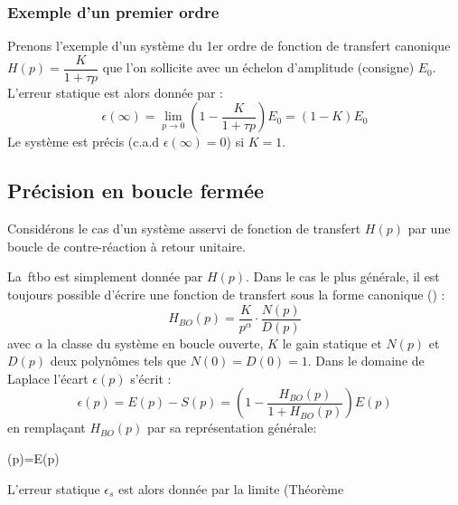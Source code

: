 \subsubsection{Exemple d'un premier ordre}
Prenons l'exemple d'un système du 1er ordre de fonction de transfert canonique 
$H(p)=\dfrac{K}{1+\tau p}$ que l'on sollicite avec un échelon 
d'amplitude (consigne) $E_0$.
L'erreur statique est alors donnée par :
\[
\epsilon(\infty)=\lim\limits_{p\to 0}\left(1-\dfrac{K}{1+\tau p}\right)E_0
                =(1-K)E_0
\]
Le système est précis (c.a.d $\epsilon(\infty)=0$) si $K=1$. 
\subsection{Précision en boucle fermée}
Considérons le cas d'un système asservi de fonction de transfert $H(p)$
par une boucle de contre-réaction à retour unitaire.
\begin{center}
    
\end{center}
La~\gls{ftbo} est simplement donnée par $H(p)$. Dans le cas le plus
générale, il est toujours possible d'écrire une fonction de transfert
sous la forme canonique () :
\[
H_{BO}(p)=\dfrac{K}{p^\alpha}\cdot\dfrac{N(p)}{D(p)}
\]
avec $\alpha$ la classe du système en boucle ouverte, $K$ le gain statique et 
$N(p)$ et $D(p)$ deux polynômes tels que $N(0)=D(0)=1$. 
Dans le domaine de Laplace l'écart $\epsilon(p)$ s'écrit :
\[
\epsilon(p)=E(p)-S(p)=\left(1-\dfrac{H_{BO}(p)}{1+H_{BO}(p)}\right)E(p)
\]
en remplaçant $H_{BO}(p)$ par sa représentation générale:
\begin{bequation}
    \epsilon(p)=E(p)
\end{bequation}
L'erreur statique $\epsilon_s$ est alors donnée par la limite (Théorème 
